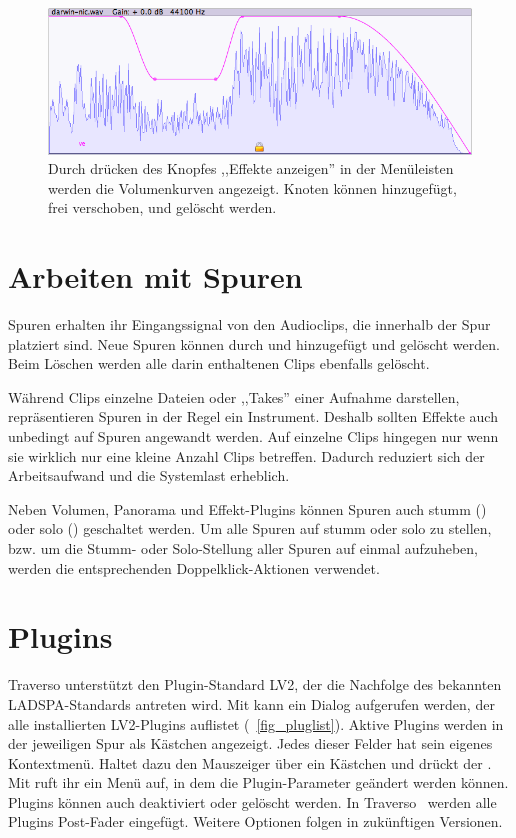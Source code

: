 \begin{figure}[t]
 \centering\includegraphics[width=\textwidth]{../images/gcurve01}
 \caption{Durch drücken des Knopfes ,,Effekte anzeigen'' in der Menüleisten werden die Volumenkurven angezeigt. Knoten können hinzugefügt, frei verschoben, und gelöscht werden.}
 \label{fig_gcurve01}
\end{figure}

\section{Arbeiten mit Spuren}
Spuren erhalten ihr Eingangssignal von den Audioclips, die innerhalb der Spur platziert sind. Neue Spuren können durch  und  hinzugefügt und gelöscht werden. Beim Löschen werden alle darin enthaltenen Clips ebenfalls gelöscht.

Während Clips einzelne Dateien oder ,,Takes'' einer Aufnahme darstellen, repräsentieren Spuren in der Regel ein Instrument. Deshalb sollten Effekte auch unbedingt auf Spuren angewandt werden. Auf einzelne Clips hingegen nur wenn sie wirklich nur eine kleine Anzahl Clips betreffen. Dadurch reduziert sich der Arbeitsaufwand und die Systemlast erheblich.

Neben Volumen, Panorama und Effekt-Plugins können Spuren auch stumm () oder solo () geschaltet werden. Um alle Spuren auf stumm oder solo zu stellen, bzw. um die Stumm- oder Solo-Stellung aller Spuren auf einmal aufzuheben, werden die entsprechenden Doppelklick-Aktionen \dact{} verwendet.

\section{Plugins}
Traverso unterstützt den Plugin-Standard LV2, der die Nachfolge des bekannten LADSPA-Standards antreten wird. Mit  kann ein Dialog aufgerufen werden, der alle installierten LV2-Plugins auflistet (\FigB~\ref{fig_pluglist}). Aktive Plugins werden in der jeweiligen Spur als Kästchen angezeigt. Jedes dieser Felder hat sein eigenes Kontextmenü. Haltet dazu den Mauszeiger über ein Kästchen und drückt  der . Mit  ruft ihr ein Menü auf, in dem die Plugin-Parameter geändert werden können. Plugins können auch deaktiviert  oder gelöscht  werden. In Traverso \Version\ werden alle Plugins Post-Fader eingefügt. Weitere Optionen folgen in zukünftigen Versionen.

